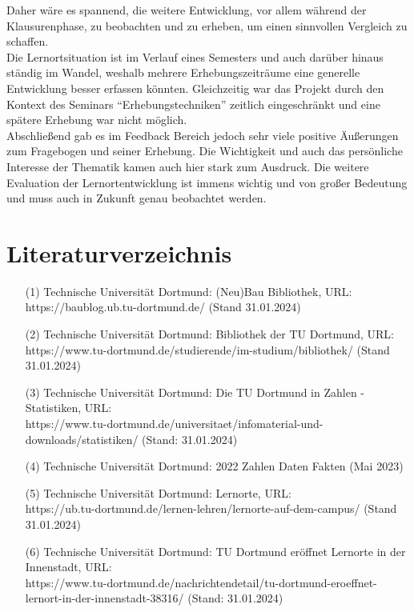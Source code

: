 \documentclass[11pt, a4paper]{article}
\begin{document}
Daher wäre es spannend, die weitere Entwicklung, vor allem während der Klausurenphase, zu beobachten und zu erheben, um einen sinnvollen Vergleich zu schaffen.\\
Die Lernortsituation ist im Verlauf eines Semesters und auch darüber hinaus ständig im Wandel, weshalb mehrere Erhebungszeiträume eine generelle Entwicklung besser erfassen könnten. Gleichzeitig war das Projekt durch den Kontext des Seminars “Erhebungstechniken” zeitlich eingeschränkt und eine spätere Erhebung war nicht möglich.\\
Abschließend gab es im Feedback Bereich jedoch sehr viele positive Äußerungen zum Fragebogen und seiner Erhebung. Die Wichtigkeit und auch das persönliche Interesse der Thematik kamen auch hier stark zum Ausdruck. Die weitere Evaluation der Lernortentwicklung ist immens wichtig und von großer Bedeutung und muss auch in Zukunft genau beobachtet werden.

\newpage

\section{Literaturverzeichnis}
\label{seitenverweis}
\vspace{1cm}
\begin{enumerate}
	
\item[(1)] Technische Universität Dortmund: (Neu)Bau Bibliothek, URL: \\ https://baublog.ub.tu-dortmund.de/ (Stand 31.01.2024) \\

\item [(2)] Technische Universität Dortmund: Bibliothek der TU Dortmund, URL: \\ https://www.tu-dortmund.de/studierende/im-studium/bibliothek/ (Stand 31.01.2024) \\

\item [(3)] Technische Universität Dortmund: Die TU Dortmund in Zahlen - Statistiken, URL: \\ https://www.tu-dortmund.de/universitaet/infomaterial-und-downloads/statistiken/ (Stand: 31.01.2024) \\

\item [(4)] Technische Universität Dortmund: 2022 Zahlen Daten Fakten (Mai 2023) \\

\item [(5)] Technische Universität Dortmund: Lernorte, URL: \\ https://ub.tu-dortmund.de/lernen-lehren/lernorte-auf-dem-campus/ (Stand 31.01.2024) \\

\item [(6)] Technische Universität Dortmund: TU Dortmund eröffnet Lernorte in der Innenstadt, URL: \\ https://www.tu-dortmund.de/nachrichtendetail/tu-dortmund-eroeffnet-lernort-in-der-innenstadt-38316/ (Stand: 31.01.2024)

\end{enumerate}
\end{document}
